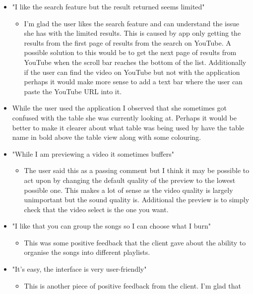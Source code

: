 \documentclass{article}
\begin{document}
\begin{itemize}
    \item "I like the search feature but the result returned seems limited"
    \begin{itemize}
        \item I'm glad the user likes the search feature and can understand the issue
            she has with the limited results. This is caused by app only getting the results
            from the first page of results from the search on YouTube. A possible solution
            to this would be to get the next page of results from YouTube when the scroll bar
            reaches the bottom of the list. Additionally if the user can find the video
            on YouTube but not with the application perhaps it would make more sense to
            add a text bar where the user can paste the YouTube URL into it.
    \end{itemize}
    \item While the user used the application I observed that she sometimes got confused with the
        table she was currently looking at. Perhaps it would be better to make it clearer
        about what table was being used by have the table name in bold above the table
        view along with some colouring.
    \item "While I am previewing a video it sometimes buffers"
    \begin{itemize}
        \item The user said this as a passing comment but I think it may be possible to act upon
            by changing the default quality of the preview to the lowest possible one. This
            makes a lot of sense as the video quality is largely unimportant but the sound
            quality is. Additional the preview is to simply check that the video select
            is the one you want.
    \end{itemize}
    \item "I like that you can group the songs so I can choose what I burn"
    \begin{itemize}
        \item This was some positive feedback that the client gave about the ability to
            organise the songs into different playlists.
    \end{itemize}
    \item "It's easy, the interface is very user-friendly"
    \begin{itemize}
        \item This is another piece of positive feedback from the client. I'm glad that

\end{itemize}
\end{itemize}
\end{document}

